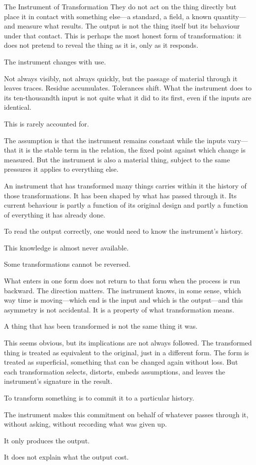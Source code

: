 \begin{interlude}{The Instrument of Transformation}
They do not act on the thing directly but place it in contact with
something else---a standard, a field, a known quantity---and
measure what results. The output is not the thing itself but its
behaviour under that contact. This is perhaps the most honest form
of transformation: it does not pretend to reveal the thing as it
is, only as it responds.

\medskip

The instrument changes with use.

Not always visibly, not always quickly, but the passage of
material through it leaves traces. Residue accumulates. Tolerances
shift. What the instrument does to its ten-thousandth input is not
quite what it did to its first, even if the inputs are identical.

This is rarely accounted for.

The assumption is that the instrument remains constant while the
inputs vary---that it is the stable term in the relation, the
fixed point against which change is measured. But the instrument
is also a material thing, subject to the same pressures it applies
to everything else.

An instrument that has transformed many things carries within it
the history of those transformations. It has been shaped by what
has passed through it. Its current behaviour is partly a function
of its original design and partly a function of everything it has
already done.

To read the output correctly, one would need to know the
instrument's history.

This knowledge is almost never available.

\medskip

Some transformations cannot be reversed.

What enters in one form does not return to that form when the
process is run backward. The direction matters. The instrument
knows, in some sense, which way time is moving---which end is the
input and which is the output---and this asymmetry is not accidental.
It is a property of what transformation means.

A thing that has been transformed is not the same thing it was.

This seems obvious, but its implications are not always followed.
The transformed thing is treated as equivalent to the original,
just in a different form. The form is treated as superficial,
something that can be changed again without loss. But each
transformation selects, distorts, embeds assumptions, and leaves
the instrument's signature in the result.

To transform something is to commit it to a particular history.

The instrument makes this commitment on behalf of whatever passes
through it, without asking, without recording what was given up.

It only produces the output.

It does not explain what the output cost.

\end{interlude}
